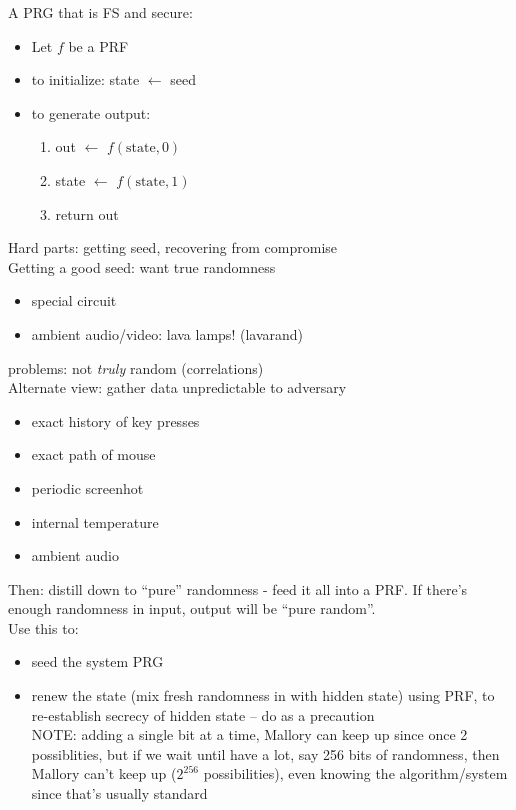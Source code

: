 \begin{example}{A PRG that is FS and secure:}
    \begin{itemize}
    \item Let $f$ be a PRF
    \item to initialize: state $\leftarrow$ seed
    \item to generate output:
    \begin{enumerate}
        \item out $\leftarrow$ $f(\text{state}, 0)$
        \item state $\leftarrow$ $f(\text{state}, 1)$
        \item return out
    \end{enumerate}
    \end{itemize}
\end{example}

Hard parts: getting seed, recovering from compromise\\

Getting a good seed: want true randomness
\begin{itemize}
    \item special circuit
    \item ambient audio/video: lava lamps! (lavarand)
\end{itemize}
problems: not \emph{truly} random (correlations)\\

Alternate view: gather data unpredictable to adversary
\begin{itemize}
    \item exact history of key presses
    \item exact path of mouse
    \item periodic screenhot
    \item internal temperature
    \item ambient audio
\end{itemize}
Then: distill down to ``pure'' randomness - feed it all into a PRF. If there's
enough randomness in input, output will be ``pure random''.\\
Use this to:
\begin{itemize}
    \item seed the system PRG
    \item renew the state (mix fresh randomness in with hidden state) using PRF,
        to re-establish secrecy of hidden state -- do as a precaution\\

        NOTE: adding a single bit at a time, Mallory can keep up since once 2
        possiblities, but if we wait until have a lot, say 256 bits of
        randomness, then Mallory can't keep up ($2^{256}$ possibilities), even
        knowing the algorithm/system since that's usually standard
\end{itemize}

